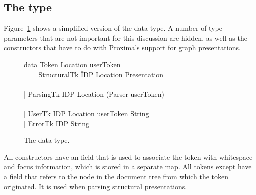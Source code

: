 \documentclass[12pt]{article}
\begin{document}

\subsection{The  type}

Figure~\ref{fig:tokenType} shows a simplified version of the  data type. A number of type parameters that are not important for this discussion are hidden, as well as the constructors that have to do with Proxima's support for graph presentations. 

\begin{figure}
\begin{center}
\begin{tabbedCode}
data Token Location userToken\\ 
~~\= =  StructuralTk \= IDP Location Presentation \\
  \>                 \\
  \> | ParsingTk     \> IDP Location (Parser userToken)\\
  \>                 \\
  \> | UserTk        \> IDP Location userToken String \\
  \> | ErrorTk       \> IDP String \\
\end{tabbedCode}
\caption{The  data type.} \label{fig:tokenType} 
\end{center}
\end{figure}


All constructors have an  field that is used to associate the token with whitespace and focus information, which is stored in a separate map. All tokens except  have a  field that refers to the node in the document tree from which the token originated. It is used when parsing structural presentations. 
\end{document}
